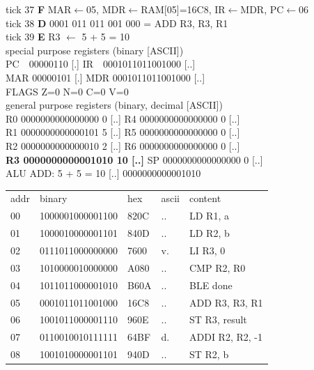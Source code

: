 \noindent\begin{tcolorbox}[stepbox, title={Instruction 13 \hfill ticks 37 to 39 \quad ADD R3, R3, R1}]
\textcolor{dim}{tick 37} \textbf{F} MAR$\leftarrow$05, MDR$\leftarrow$RAM[05]=16C8, IR$\leftarrow$MDR, PC$\leftarrow$06\\
\textcolor{dim}{tick 38} \textbf{D} 0001 011 011 001 000 = ADD R3, R3, R1\\
\textcolor{dim}{tick 39} \textbf{E} R3 $\leftarrow$ 5 + 5 = 10\\[2pt]
\textcolor{dim}{special purpose registers (binary [ASCII])}\\
PC~~00000110 [.] \hfill IR~~0001011011001000 [..]\\
MAR 00000101 [.] \hfill MDR 0001011011001000 [..]\\
FLAGS Z=0 N=0 C=0 V=0\\[2pt]
\textcolor{dim}{general purpose registers (binary, decimal [ASCII])}\\
R0 0000000000000000 0 [..] \hfill R4 0000000000000000 0 [..]\\
R1 0000000000000101 5 [..] \hfill R5 0000000000000000 0 [..]\\
R2 0000000000000010 2 [..] \hfill R6 0000000000000000 0 [..]\\
\textcolor{wrt}{\textbf{R3 0000000000001010 10 [..]}} \hfill SP 0000000000000000 0 [..]\\
\textcolor{dim}{ALU} ADD: 5 + 5 = 10 [..] \hfill 0000000000001010\\[2pt]
{\setlength{\tabcolsep}{2pt}\begin{tabular}{@{}lllll@{}}
\textcolor{dim}{addr} & \textcolor{dim}{binary} & \textcolor{dim}{hex} & \textcolor{dim}{ascii} & \textcolor{dim}{content}\\
00 & 1000001000001100 & 820C & .. & LD R1, a\\
01 & 1000010000001101 & 840D & .. & LD R2, b\\
02 & 0111011000000000 & 7600 & v. & LI R3, 0\\
03 & 1010000010000000 & A080 & .. & CMP R2, R0\\
04 & 1011011000001010 & B60A & .. & BLE done\\
05 & 0001011011001000 & 16C8 & .. & ADD R3, R3, R1\\
\rowcolor{pcc}06 & 1001011000001110 & 960E & .. & ST R3, result\\
07 & 0110010010111111 & 64BF & d. & ADDI R2, R2, -1\\
08 & 1001010000001101 & 940D & .. & ST R2, b\\

\end{tabular}}
\end{tcolorbox}
